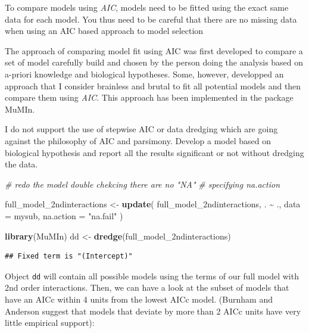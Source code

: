 \documentclass[
  12pt,
]{book}
\makeatletter
\newenvironment{Shaded}{\begin{snugshade}}{\end{snugshade}}
\newcommand{\CommentTok}[1]{\textcolor[rgb]{0.56,0.35,0.01}{\textit{#1}}}
\newcommand{\DataTypeTok}[1]{\textcolor[rgb]{0.13,0.29,0.53}{#1}}
\newcommand{\KeywordTok}[1]{\textcolor[rgb]{0.13,0.29,0.53}{\textbf{#1}}}
\newcommand{\NormalTok}[1]{#1}
\newcommand{\OperatorTok}[1]{\textcolor[rgb]{0.81,0.36,0.00}{\textbf{#1}}}
\newcommand{\StringTok}[1]{\textcolor[rgb]{0.31,0.60,0.02}{#1}}
\newenvironment{kframe}{%
\medskip{}
\setlength{\fboxsep}{.8em}
\def\at@end@of@kframe{}%
\ifinner\ifhmode%
 \def\at@end@of@kframe{\end{minipage}}%
 \begin{minipage}{\columnwidth}%
\fi\fi%
\def\FrameCommand##1{\hskip\@totalleftmargin \hskip-\fboxsep
\colorbox{incolor}{##1}\hskip-\fboxsep
    \hskip-\linewidth \hskip-\@totalleftmargin \hskip\columnwidth}%
\MakeFramed {\advance\hsize-\width
  \@totalleftmargin\z@ \linewidth\hsize
  \@setminipage}}%
{\par\unskip\endMakeFramed%
\at@end@of@kframe}
\newenvironment{rmdblock}[1]
 {
 \begin{itemize}
 \renewcommand{\labelitemi}{
   \raisebox{-.7\height}[0pt][0pt]{
     {\setkeys{Gin}{width=3em,keepaspectratio}\texttt{[image: images/\#1]}}
   }
 }
 \begin{kframe}
 \setlength{\fboxsep}{1em}
 \item
 }
 {
 \end{kframe}
 \end{itemize}
 }
\newenvironment{rmdnote}
  {\begin{rmdblock}{note}}
  {\end{rmdblock}}
\newenvironment{rmdwarning}
  {\begin{rmdblock}{warning}}
  {\end{rmdblock}}
\makeatother
\begin{document}
\begin{rmdwarning}
To compare models using \emph{AIC}, models need to be fitted using the exact same data for each model. You thus need to be careful that there are no missing data when using an AIC based approach to model selection
\end{rmdwarning}

The approach of comparing model fit using AIC was first developed to compare a set of model carefully build and chosen by the person doing the analysis based on a-priori knowledge and biological hypotheses. Some, however, developped an approach that I consider brainless and brutal to fit all potential models and then compare them using \emph{AIC}. This approach has been implemented in the package MuMIn.

\begin{rmdnote}
I do not support the use of stepwise AIC or data dredging which are going against the philosophy of AIC and parsimony. Develop a model based on biological hypothesis and report all the results significant or not without dredging the data.
\end{rmdnote}

\begin{Shaded}
\begin{Highlighting}[]
\CommentTok{\# redo the model double chekcing there are no "NA"}
\CommentTok{\# specifying na.action}

\NormalTok{full\_model\_2ndinteractions \textless{}{-}}\StringTok{ }\KeywordTok{update}\NormalTok{(}
\NormalTok{  full\_model\_2ndinteractions,}
\NormalTok{  . }\OperatorTok{\textasciitilde{}}\StringTok{ }\NormalTok{.,}
  \DataTypeTok{data =}\NormalTok{ mysub,}
  \DataTypeTok{na.action =} \StringTok{"na.fail"}
\NormalTok{)}

\KeywordTok{library}\NormalTok{(MuMIn)}
\NormalTok{dd \textless{}{-}}\StringTok{ }\KeywordTok{dredge}\NormalTok{(full\_model\_2ndinteractions)}
\end{Highlighting}
\end{Shaded}

\begin{verbatim}
## Fixed term is "(Intercept)"
\end{verbatim}

Object \texttt{dd} will contain all possible models using the terms of our full model with 2nd order interactions. Then, we can have a look at the subset of models that have an AICc within 4 units from the lowest AICc model. (Burnham and Anderson suggest that models that deviate by more than 2 AICc units have very
little empirical support):
\end{document}
